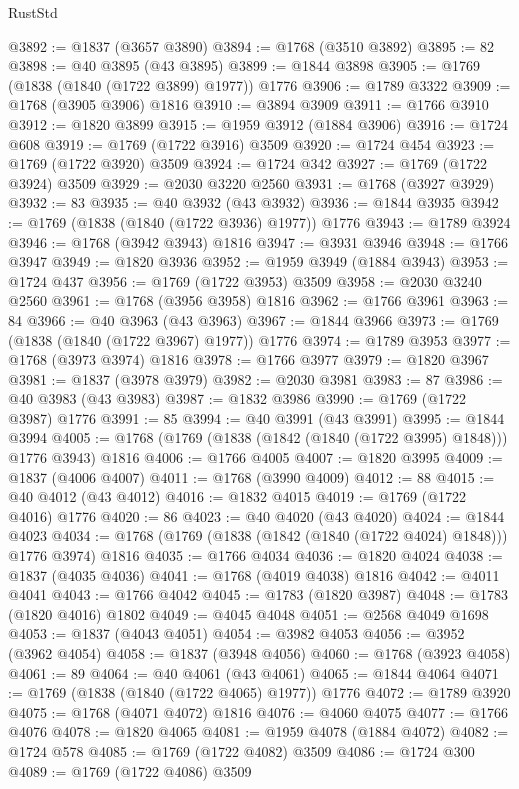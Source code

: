 \begin{lexlean}{RustStd}
\begin{coremodule}
{\begin{coremodule}
{{{{{{{{{{{{{{{{{{{{{{{{{{{{{{{{{{{{{{{{{{{{{{{@3892 := @1837 (@3657 @3890)
@3894 := @1768 (@3510 @3892)
@3895 := 82
@3898 := @40 @3895 (@43 @3895)
@3899 := @1844 @3898
@3905 := @1769 (@1838 (@1840 (@1722 @3899) @1977)) @1776
@3906 := @1789 @3322
@3909 := @1768 (@3905 @3906) @1816
@3910 := @3894 @3909
@3911 := @1766 @3910
@3912 := @1820 @3899
@3915 := @1959 @3912 (@1884 @3906)
@3916 := @1724 @608
@3919 := @1769 (@1722 @3916) @3509
@3920 := @1724 @454
@3923 := @1769 (@1722 @3920) @3509
@3924 := @1724 @342
@3927 := @1769 (@1722 @3924) @3509
@3929 := @2030 @3220 @2560
@3931 := @1768 (@3927 @3929)
@3932 := 83
@3935 := @40 @3932 (@43 @3932)
@3936 := @1844 @3935
@3942 := @1769 (@1838 (@1840 (@1722 @3936) @1977)) @1776
@3943 := @1789 @3924
@3946 := @1768 (@3942 @3943) @1816
@3947 := @3931 @3946
@3948 := @1766 @3947
@3949 := @1820 @3936
@3952 := @1959 @3949 (@1884 @3943)
@3953 := @1724 @437
@3956 := @1769 (@1722 @3953) @3509
@3958 := @2030 @3240 @2560
@3961 := @1768 (@3956 @3958) @1816
@3962 := @1766 @3961
@3963 := 84
@3966 := @40 @3963 (@43 @3963)
@3967 := @1844 @3966
@3973 := @1769 (@1838 (@1840 (@1722 @3967) @1977)) @1776
@3974 := @1789 @3953
@3977 := @1768 (@3973 @3974) @1816
@3978 := @1766 @3977
@3979 := @1820 @3967
@3981 := @1837 (@3978 @3979)
@3982 := @2030 @3981
@3983 := 87
@3986 := @40 @3983 (@43 @3983)
@3987 := @1832 @3986
@3990 := @1769 (@1722 @3987) @1776
@3991 := 85
@3994 := @40 @3991 (@43 @3991)
@3995 := @1844 @3994
@4005 := @1768 (@1769 (@1838 (@1842 (@1840 (@1722 @3995) @1848))) @1776 @3943) @1816
@4006 := @1766 @4005
@4007 := @1820 @3995
@4009 := @1837 (@4006 @4007)
@4011 := @1768 (@3990 @4009)
@4012 := 88
@4015 := @40 @4012 (@43 @4012)
@4016 := @1832 @4015
@4019 := @1769 (@1722 @4016) @1776
@4020 := 86
@4023 := @40 @4020 (@43 @4020)
@4024 := @1844 @4023
@4034 := @1768 (@1769 (@1838 (@1842 (@1840 (@1722 @4024) @1848))) @1776 @3974) @1816
@4035 := @1766 @4034
@4036 := @1820 @4024
@4038 := @1837 (@4035 @4036)
@4041 := @1768 (@4019 @4038) @1816
@4042 := @4011 @4041
@4043 := @1766 @4042
@4045 := @1783 (@1820 @3987)
@4048 := @1783 (@1820 @4016) @1802
@4049 := @4045 @4048
@4051 := @2568 @4049 @1698
@4053 := @1837 (@4043 @4051)
@4054 := @3982 @4053
@4056 := @3952 (@3962 @4054)
@4058 := @1837 (@3948 @4056)
@4060 := @1768 (@3923 @4058)
@4061 := 89
@4064 := @40 @4061 (@43 @4061)
@4065 := @1844 @4064
@4071 := @1769 (@1838 (@1840 (@1722 @4065) @1977)) @1776
@4072 := @1789 @3920
@4075 := @1768 (@4071 @4072) @1816
@4076 := @4060 @4075
@4077 := @1766 @4076
@4078 := @1820 @4065
@4081 := @1959 @4078 (@1884 @4072)
@4082 := @1724 @578
@4085 := @1769 (@1722 @4082) @3509
@4086 := @1724 @300
@4089 := @1769 (@1722 @4086) @3509
}}}}}}}}}}}}}}}}}}}}}}}}}}}}}}}}}}}}}}}}}}}}}}}
\end{coremodule}}
\end{coremodule}
\end{lexlean}
